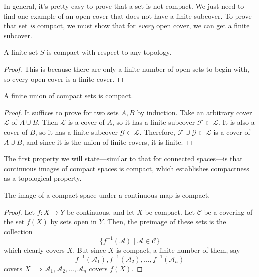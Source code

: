   In general, it's pretty easy to prove that a set is not compact. We just need to find one example of an open cover that does not have a finite subcover. To prove that set \textit{is} compact, we must show that for \textit{every} open cover, we can get a finite subcover. 

  \begin{lemma}
    A finite set $S$ is compact with respect to any topology. 
  \end{lemma}
  \begin{proof}
    This is because there are only a finite number of open sets to begin with, so every open cover is a finite cover. 
  \end{proof}

  \begin{lemma}
    A finite union of compact sets is compact. 
  \end{lemma}
  \begin{proof}
    It suffices to prove for two sets $A, B$ by induction. Take an arbitrary cover $\mathscr{L}$ of $A \cup B$. Then $\mathscr{L}$ is a cover of $A$, so it has a finite subcover $\mathscr{F} \subset \mathscr{L}$. It is also a cover of $B$, so it has a finite subcover $\mathscr{G} \subset \mathscr{L}$. Therefore, $\mathscr{F} \cup \mathscr{G} \subset \mathscr{L}$ is a cover of $A \cup B$, and since it is the union of finite covers, it is finite. 
  \end{proof}

  The first property we will state---similar to that for connected spaces---is that continuous images of compact spaces is compact, which establishes compactness as a topological property. 

  \begin{theorem}
    The image of a compact space under a continuous map is compact.
  \end{theorem}
  \begin{proof}
    Let $f: X \rightarrow Y$ be continuous, and let $X$ be compact. Let $\mathcal{C}$ be a covering of the set $f(X)$ by sets open in $Y$. Then, the preimage of these sets is the collection
    \begin{equation}
      \{f^{-1}(\mathcal{A}) \; | \; \mathcal{A} \in \mathcal{C}\}
    \end{equation}
    which clearly covers $X$. But since $X$ is compact, a finite number of them, say
    \begin{equation}
      f^{-1} (\mathcal{A}_1), f^{-1} (\mathcal{A}_2), \ldots , f^{-1} (\mathcal{A}_n)
    \end{equation}
    covers $X \implies \mathcal{A}_1, \mathcal{A}_2, \ldots, \mathcal{A}_n$ covers $f(X)$. 
  \end{proof}

